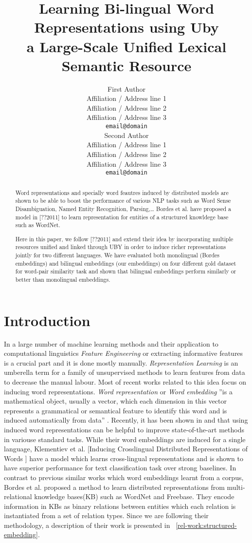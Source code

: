 \documentclass[11pt]{article}
\title{Learning Bi-lingual Word Representations using Uby \\a Large-Scale Unified
Lexical Semantic Resource}
\author{First Author \\
  Affiliation / Address line 1 \\
  Affiliation / Address line 2 \\
  Affiliation / Address line 3 \\
  {\tt email@domain} \\\And
  Second Author \\
  Affiliation / Address line 1 \\
  Affiliation / Address line 2 \\
  Affiliation / Address line 3 \\
  {\tt email@domain} \\}
\date{}
\begin{document}
\maketitle
\begin{abstract}
  Word representations and specially word feautres induced by distributed models
  are shown to be able to boost the performance of various NLP tasks such as
  Word Sense Disambiguation, Named Entity Recognition, Parsing,\ldots
  Bordes et al. have proposed a model in [??2011] to learn
  representation for entities of a structured knowldege base such as WordNet.
  
  Here in this paper, we follow [??2011] and extend their idea by
  incorporating multiple resources unified and linked through UBY
  in order to induce richer representations jointly for two different languages.  
  We have evaluated both monolingual (Bordes embeddings) and bilingual embeddings (our embeddings) on four different gold dataset
for word-pair similarity task and shown that bilingual embeddings perform similarly or better than monolingual embeddings.
\end{abstract}


\section{Introduction}

In a large number of machine learning methods and their application to computational linguistics
 \emph{Feature Engineering} or extracting informative features is a crucial part
 and it is done mostly manually. \emph{Representation Learning} is an umberella term
for a family of unsupervised methods to learn features from data to decrease the manual labour. Most of recent
works related to this idea focus on inducing word
representations. \emph{Word representation} or \emph{Word embedding} ''is a mathematical object, usually a
vector, which each dimension in this vector represents a grammatical or
semantical feature to identify this word and is induced automatically from data''
\cite{Turian2010b}. Recently, it has been shown in \cite{Turian2010b} and \cite{Collobert2011} that using
 induced word representations can be helpful to improve state-of-the-art methods in 
variouse standard tasks. While their word embeddings are induced for a single
language, Klementiev et al.
[Inducing Crosslingual Distributed Representations of Words ] have a model which
learns cross-lingual representations and is shown to have superior performance
for text classification task over strong baselines. In contrast to previous similar works which word
embeddings learnt from a corpus, Bordes et al. proposed a method
\cite{Bordes2011} to learn distributed representations from multi-relational knowledge bases(KB) such as WordNet 
and Freebase. 
They encode information in KBs as binary relations between entities which each relation
 is instantiated from a set of relation types. Since we are following their methodology, 
 a description of their work is presented in ~\ref{rel-work:structured-embedding}.
 
\end{document}
